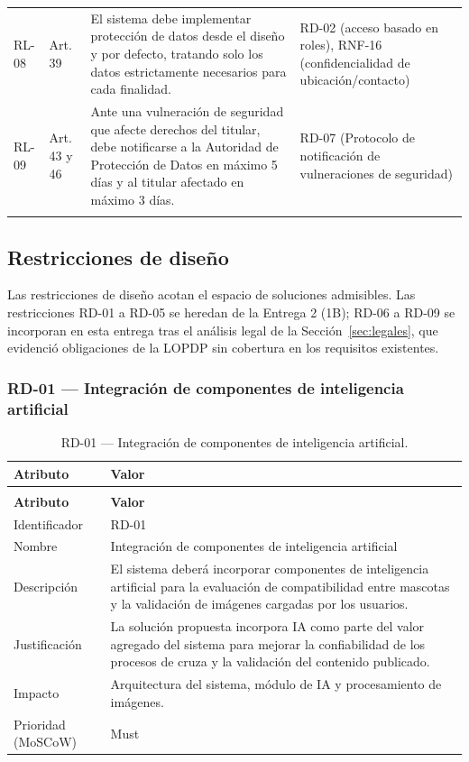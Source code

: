 \documentclass[journal,onecolumn]{IEEEtran}
\makeatletter
\newenvironment{atributos}[2]{%
	\small
	\begin{longtable}{@{}>{\raggedright\arraybackslash}p{4.2cm} >{\raggedright\arraybackslash}p{11.2cm}@{}}
		\caption{#2}\label{tab:#1}\\
		\toprule
		\textbf{Atributo} & \textbf{Valor} \\
		\midrule
		\endfirsthead
		\multicolumn{2}{@{}l}{\small\itshape (continuación)}\\
		\toprule
		\textbf{Atributo} & \textbf{Valor} \\
		\midrule
		\endhead
		\bottomrule
		\endlastfoot
	}{%
	\end{longtable}
	\normalsize
}
\makeatother
\begin{document}
\begin{table}[H]
\begin{tabularx}{\textwidth}{@{}p{1.1cm} p{1.9cm} p{5.4cm} X@{}}
			\addlinespace
			RL-08 & Art. 39 & El sistema debe implementar protección de datos desde el diseño y por defecto, tratando solo los datos estrictamente necesarios para cada finalidad. & RD-02 (acceso basado en roles), RNF-16 (confidencialidad de ubicación/contacto) \\
			\addlinespace
			RL-09 & Art. 43 y 46 & Ante una vulneración de seguridad que afecte derechos del titular, debe notificarse a la Autoridad de Protección de Datos en máximo 5 días y al titular afectado en máximo 3 días. & RD-07 (Protocolo de notificación de vulneraciones de seguridad) \\
			\addlinespace
			\bottomrule
		\end{tabularx}
	\end{table}
	
	
	\subsection{Restricciones de diseño}
	\label{sec:restricciones}
	
	Las restricciones de diseño acotan el espacio de soluciones admisibles. Las
	restricciones RD-01 a RD-05 se heredan de la Entrega 2 (1B); RD-06 a RD-09 se
	incorporan en esta entrega tras el análisis legal de la Sección~\ref{sec:legales},
	que evidenció obligaciones de la LOPDP sin cobertura en los requisitos existentes.
	
	\subsubsection{RD-01 --- Integración de componentes de inteligencia artificial}
	
	\begin{atributos}{RD-01}{RD-01 --- Integración de componentes de inteligencia artificial.}
		Identificador & RD-01 \\
		Nombre & Integración de componentes de inteligencia artificial \\
		Descripción & El sistema deberá incorporar componentes de inteligencia artificial para la evaluación de compatibilidad entre mascotas y la validación de imágenes cargadas por los usuarios. \\
		Justificación & La solución propuesta incorpora IA como parte del valor agregado del sistema para mejorar la confiabilidad de los procesos de cruza y la validación del contenido publicado. \\
		Impacto & Arquitectura del sistema, módulo de IA y procesamiento de imágenes. \\
		Prioridad (MoSCoW) & Must \\
	\end{atributos}
	
\end{document}
